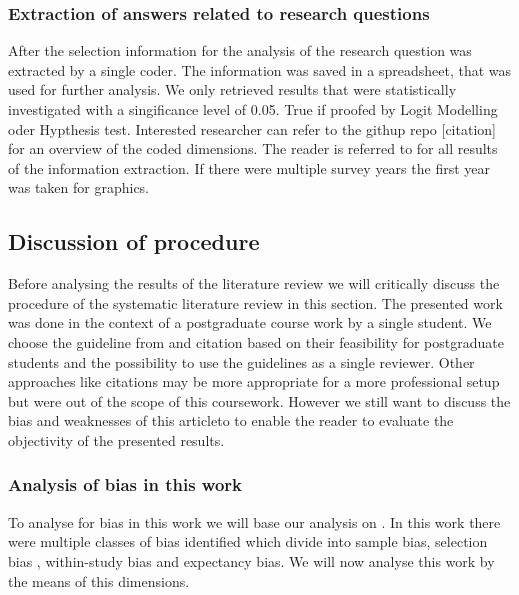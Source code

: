 \subsubsection{Extraction of answers related to research questions}

After the selection information for the analysis of the research question was extracted by a single coder. The information was saved in a spreadsheet, that was used for further analysis. We only retrieved results that were statistically investigated with a singificance level of 0.05. True if proofed by Logit Modelling oder Hypthesis test. Interested researcher can refer to the githup repo [citation] for an overview of the coded dimensions. The reader is referred to  \cite{langenbahn_data_2021} for all results of the information extraction. If there were multiple survey years the first year was taken for graphics.


\subsection{Discussion of procedure}

Before analysing the results of the literature review we will critically discuss the procedure of the systematic literature review in this section. The presented work was done in the context of a postgraduate course work by a single student. We choose the guideline from \cite{silva_systematic_2016} and citation based on their feasibility for postgraduate students and the possibility to use the guidelines as a single reviewer. Other approaches like citations may be more appropriate for a more professional setup but were out of the scope of this coursework. However we still want to discuss the bias and weaknesses of this articleto to enable the reader to evaluate the objectivity of the presented results.


\subsubsection{Analysis of bias in this work}

To analyse for bias in this work we will base our analysis on \cite{durach_new_2017}. In this work there were multiple classes of bias identified which divide into sample bias, selection bias , within-study bias and expectancy bias. We will now analyse this work by the means of this dimensions.

